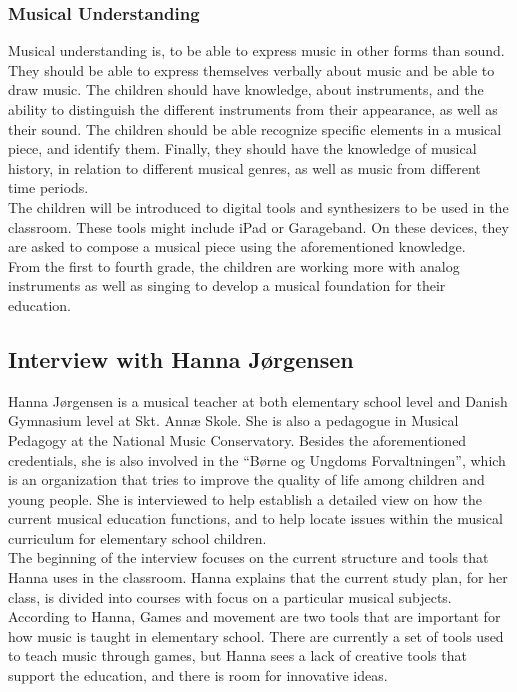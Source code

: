 \subsubsection*{Musical Understanding}
Musical understanding is, to be able to express music in other forms than sound. They should be able to express themselves verbally about music and be able to draw music. The children should have knowledge, about instruments, and the ability to distinguish the different instruments from their appearance, as well as their sound. The children should be able recognize specific elements in a musical piece, and identify them. Finally, they should have the knowledge of musical history, in relation to different musical genres, as well as music from different time periods\cite{studyPlan}.\\

The children will be introduced to digital tools and synthesizers to be used in the classroom. These tools might include iPad or Garageband. On these devices, they are asked to compose a musical piece using the aforementioned knowledge.\\
From the first to fourth grade, the children are working more with analog instruments as well as singing to develop a musical foundation for their education.\\

\subsection{Interview with Hanna Jørgensen} \label{ProblemArea} 
Hanna Jørgensen is a musical teacher at both elementary school level and Danish Gymnasium level at Skt. Annæ Skole. She is also a pedagogue in Musical Pedagogy at the National Music Conservatory. Besides the aforementioned credentials, she is also involved in the “Børne og Ungdoms Forvaltningen”, which is an organization that tries to improve the quality of life among children and young people. She is interviewed to help establish a detailed view on how the current musical education functions, and to help locate issues within the musical curriculum for elementary school children.\\ 

The beginning of the interview focuses on the current structure and tools that Hanna uses in the classroom. Hanna explains that the current study plan, for her class, is divided into courses with focus on a particular musical subjects. According to Hanna, Games and movement are two tools that are important for how music is taught in elementary school. There are currently a set of tools used to teach music through games, but Hanna sees a lack of creative tools that support the education, and there is room for innovative ideas.\\


